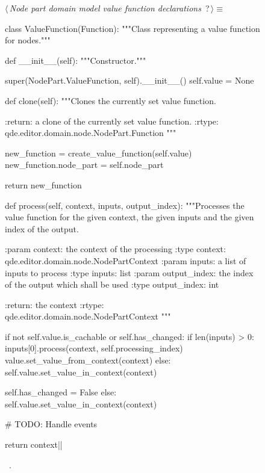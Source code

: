 \documentclass[%
    a4paper,    %
    justified,  %
    nobib,      %
    openany     %
]{tufte-book}
\makeatletter
\renewcommand{\label}[1]{\@tufte@label{##1}}%
\makeatother
\begin{document}
\begin{figure}
\begin{flushleft} \small
\begin{minipage}{\linewidth}\label{scrap113}\raggedright\small
{} $\langle\,${\itshape Node part domain model value function declarations}\nobreak\ {\footnotesize {?}}$\,\rangle\equiv$
\vspace{-1ex}
\begin{pythoncode}
class ValueFunction(Function):
    """Class representing a value function for nodes."""

    def __init__(self):
        """Constructor."""

        super(NodePart.ValueFunction, self).__init__()
        self.value = None

    def clone(self):
        """Clones the currently set value function.

        :return: a clone of the currently set value function.
        :rtype: qde.editor.domain.node.NodePart.Function
        """

        new_function = create_value_function(self.value)
        new_function.node_part = self.node_part

        return new_function

    def process(self, context, inputs, output_index):
        """Processes the value function for the given context, the given inputs
        and the given index of the output.

        :param context: the context of the processing
        :type  context: qde.editor.domain.node.NodePartContext
        :param inputs: a list of inputs to process
        :type inputs: list
        :param output_index: the index of the output which shall be used
        :type output_index: int

        :return: the context
        :rtype:  qde.editor.domain.node.NodePartContext
        """

        if not self.value.is_cachable or self.has_changed:
            if len(inputs) > 0:
                inputs[0].process(context, self.processing_index)
                value.set_value_from_context(context)
            else:
                self.value.set_value_in_context(context)

            self.has_changed = False
        else:
            self.value.set_value_in_context(context)

        # TODO: Handle events

        return context|\NWsep|
\end{pythoncode}
\vspace{1.5ex}
\footnotesize
\begin{list}{}{\setlength{\itemsep}{-\parsep}\setlength{\itemindent}{-\leftmargin}}
\item \NWtxtMacroRefIn\ .


\end{list}
\end{minipage}
\end{flushleft}
\end{figure}
\end{document}

